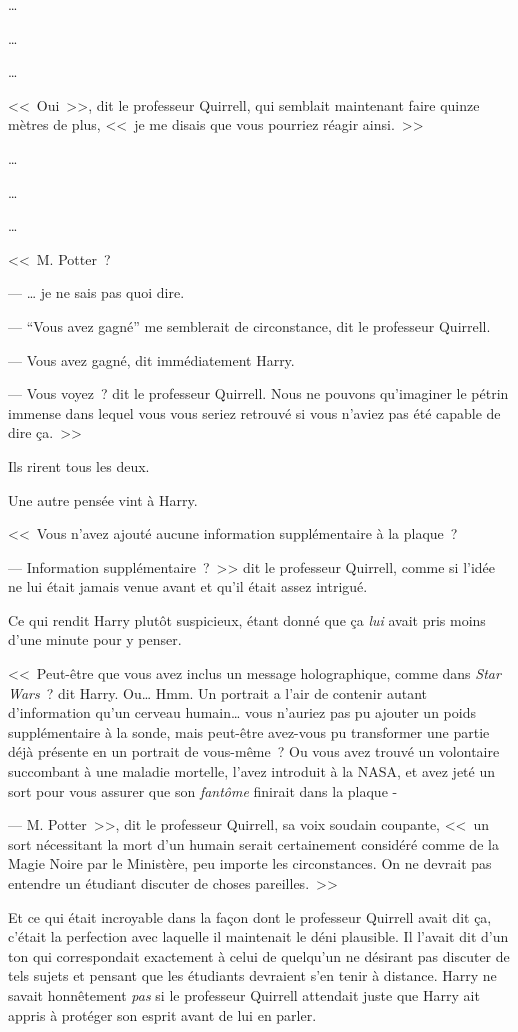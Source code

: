 …

…

…

<<~Oui~>>, dit le professeur Quirrell, qui semblait maintenant faire quinze mètres de plus, <<~je me disais que vous pourriez réagir ainsi.~>>

…

…

…

<<~M. Potter~?

--- … je ne sais pas quoi dire.

--- “Vous avez gagné” me semblerait de circonstance, dit le professeur Quirrell.

--- Vous avez gagné, dit immédiatement Harry.

--- Vous voyez~? dit le professeur Quirrell. Nous ne pouvons qu'imaginer le pétrin immense dans lequel vous vous seriez retrouvé si vous n'aviez pas été capable de dire ça.~>>

Ils rirent tous les deux.

Une autre pensée vint à Harry.

<<~Vous n'avez ajouté aucune information supplémentaire à la plaque~?

--- Information supplémentaire~?~>> dit le professeur Quirrell, comme si l'idée ne lui était jamais venue avant et qu'il était assez intrigué.

Ce qui rendit Harry plutôt suspicieux, étant donné que ça \emph{lui} avait pris moins d'une minute pour y penser.

<<~Peut-être que vous avez inclus un message holographique, comme dans \emph{Star Wars}~? dit Harry. Ou… Hmm. Un portrait a l'air de contenir autant d'information qu'un cerveau humain… vous n'auriez pas pu ajouter un poids supplémentaire à la sonde, mais peut-être avez-vous pu transformer une partie déjà présente en un portrait de vous-même~? Ou vous avez trouvé un volontaire succombant à une maladie mortelle, l'avez introduit à la NASA, et avez jeté un sort pour vous assurer que son \emph{fantôme} finirait dans la plaque -

--- M. Potter~>>, dit le professeur Quirrell, sa voix soudain coupante, <<~un sort nécessitant la mort d'un humain serait certainement considéré comme de la Magie Noire par le Ministère, peu importe les circonstances. On ne devrait pas entendre un étudiant discuter de choses pareilles.~>>

Et ce qui était incroyable dans la façon dont le professeur Quirrell avait dit ça, c'était la perfection avec laquelle il maintenait le déni plausible. Il l'avait dit d'un ton qui correspondait exactement à celui de quelqu'un ne désirant pas discuter de tels sujets et pensant que les étudiants devraient s'en tenir à distance. Harry ne savait honnêtement \emph{pas} si le professeur Quirrell attendait juste que Harry ait appris à protéger son esprit avant de lui en parler.

